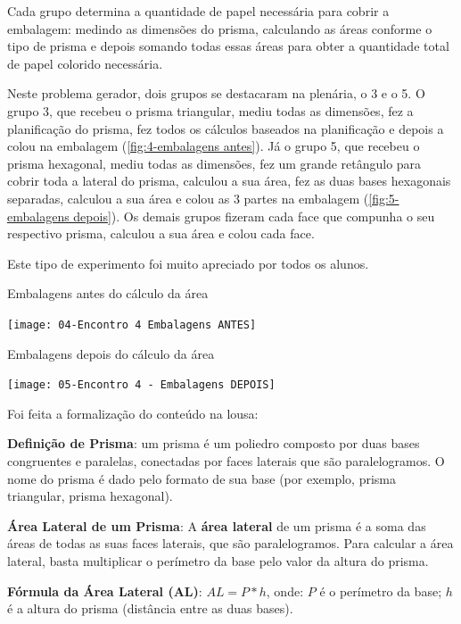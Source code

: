 Cada grupo determina a quantidade de papel necessária para cobrir a embalagem: medindo as dimensões do prisma, calculando as áreas conforme o tipo de prisma e depois somando todas essas áreas para obter a quantidade total de papel colorido necessária.

Neste problema gerador, dois grupos se destacaram na plenária, o 3 e o 5. O grupo 3, que recebeu o prisma triangular, mediu todas as dimensões, fez a planificação do prisma, fez todos os cálculos baseados na planificação e depois a colou na embalagem (\autoref{fig:4-embalagens antes}). Já o grupo 5, que recebeu o prisma hexagonal, mediu todas as dimensões, fez um grande retângulo para cobrir toda a lateral do prisma, calculou a sua área, fez as duas bases hexagonais separadas,  calculou a sua área e colou as 3 partes na embalagem (\autoref{fig:5-embalagens depois}). Os demais grupos fizeram cada face que compunha o seu respectivo prisma, calculou a sua área e colou cada face.

Este tipo de experimento foi muito apreciado por todos os alunos.

\begin{CenteredFigure}
    \caption{Embalagens antes do cálculo da área} \label{fig:4-embalagens antes}
    \texttt{[image: 04-Encontro 4 Embalagens ANTES]}
    \legend{\autoria}
\end{CenteredFigure}

\begin{CenteredFigure}
    \caption{Embalagens depois do cálculo da área} \label{fig:5-embalagens depois}
    \texttt{[image: 05-Encontro 4 - Embalagens DEPOIS]}
    \legend{\autoria}
\end{CenteredFigure}

Foi feita a formalização do conteúdo na lousa:

\textbf{Definição de Prisma}: um prisma é um poliedro composto por duas bases congruentes e paralelas, conectadas por faces laterais que são paralelogramos. O nome do prisma é dado pelo formato de sua base (por exemplo, prisma triangular, prisma hexagonal).

\textbf{Área Lateral de um Prisma}: A \textbf{área lateral} de um prisma é a soma das áreas de todas as suas faces laterais, que são paralelogramos. Para calcular a área lateral, basta multiplicar o perímetro da base pelo valor da altura do prisma.

\textbf{Fórmula da Área Lateral (AL)}: \textcolor[HTML]{0000FF}{$AL = P * h$}, onde: $P$ é o perímetro da base; $h$ é a altura do prisma (distância entre as duas bases).

